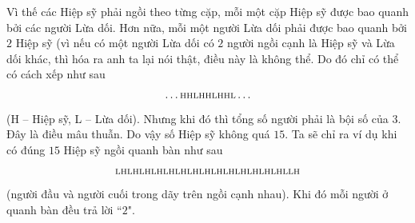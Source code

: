 \begin{multicols}{2}
	\vskip 0.1cm 
	Vì thế các Hiệp sỹ phải ngồi theo từng cặp, mỗi một cặp Hiệp sỹ được bao quanh bởi các người Lừa dối. Hơn nữa, mỗi một người Lừa dối phải được bao quanh bởi $2$ Hiệp sỹ (vì nếu có một người Lừa dối có $2$ người ngồi cạnh là Hiệp sỹ và Lừa dối khác, thì hóa ra anh ta lại nói thật, điều này là không thể. Do đó chỉ có thể có cách xếp như sau
	\begin{align*}
		\ldots\text{\scriptsize{HHLHHLHHL}}\ldots
	\end{align*}
	(H -- Hiệp sỹ, L -- Lừa dối). Nhưng khi đó thì tổng số người phải là bội số của $3$. Đây là điều mâu thuẫn. Do vậy số Hiệp sỹ không quá $15$.
	\vskip 0.1cm
	Ta sẽ chỉ ra ví dụ khi có đúng $15$ Hiệp sỹ ngồi quanh bàn như sau
	\begin{align*}
		\text{\scriptsize{LHLHLHLHLHLHLHLHLHLHLHLHLHLHLLH}}
	\end{align*}
	(người đầu và người cuối trong dãy trên ngồi cạnh nhau). Khi đó mỗi người ở quanh bàn đều trả lời ``$2$".
\end{multicols}
\newpage
\begingroup
\thispagestyle{toancuabinone}
